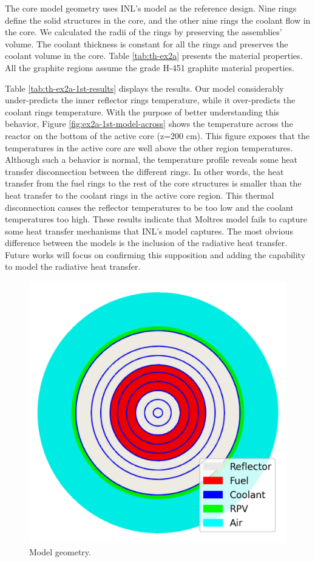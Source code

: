 The core model geometry uses INL's model as the reference design.
Nine rings define the solid structures in the core, and the other nine rings the coolant flow in the core.
We calculated the radii of the rings by preserving the assemblies' volume.
The coolant thickness is constant for all the rings and preserves the coolant volume in the core.
Table \ref{tab:th-ex2a} presents the material properties.
All the graphite regions assume the grade H-451 graphite material properties.

Table \ref{tab:th-ex2a-1st-results} displays the results.
Our model considerably under-predicts the inner reflector rings temperature, while it over-predicts the coolant rings temperature.
With the purpose of better understanding this behavior, Figure \ref{fig:ex2a-1st-model-across} shows the temperature across the reactor on the bottom of the active core (z=200 cm).
This figure exposes that the temperatures in the active core are well above the other region temperatures.
Although such a behavior is normal, the temperature profile reveals some heat transfer disconnection between the different rings.
In other words, the heat transfer from the fuel rings to the rest of the core structures is smaller than the heat transfer to the coolant rings in the active core region.
This thermal disconnection causes the reflector temperatures to be too low and the coolant temperatures too high.
These results indicate that Moltres model fails to capture some heat transfer mechanisms that INL's model captures.
The most obvious difference between the models is the inclusion of the radiative heat transfer.
Future works will focus on confirming this supposition and adding the capability to model the radiative heat transfer.

\begin{figure}[htbp!]
  \centering
  \includegraphics[width=0.45\linewidth]{figures-thermal/ex2a-meshD2}
  \hfill
  \caption{Model geometry.}
  \label{fig:ex2a-1st-model}
\end{figure}

